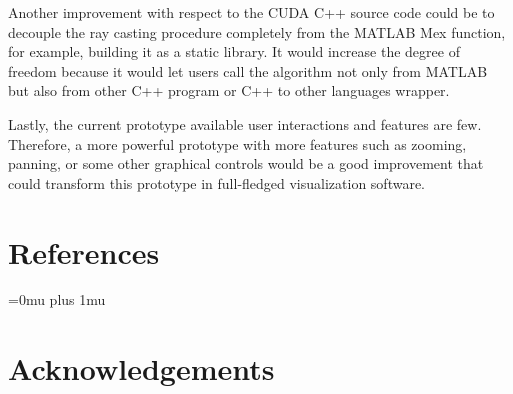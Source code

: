 \documentclass[12pt,a4paper]{extarticle}
\newcommand{\linespace}{\vspace{8pt}}
\begin{document}
Another improvement with respect to the CUDA C++ source code could be to decouple the ray casting procedure completely from the MATLAB Mex function, for example, building it as a static library. It would increase the degree of freedom because it would let users call the algorithm not only from MATLAB but also from other C++ program or C++ to other languages wrapper.
\linespace

Lastly, the current prototype available user interactions and features are few. Therefore, a more powerful prototype with more features such as zooming, panning, or some other graphical controls would be a good improvement that could transform this prototype in full-fledged visualization software.
\pagebreak
\section*{References}
\Urlmuskip=0mu plus 1mu\relax
\printbibliography[heading=none]{}
\pagebreak
\section*{Acknowledgements}
\end{document}
